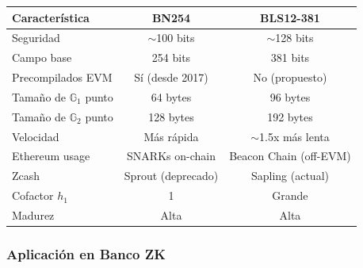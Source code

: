 \documentclass[11pt,a4paper,twoside,openright]{book}
\theoremstyle{definition}
\theoremstyle{plain}
\theoremstyle{remark}
\newcommand{\G}{\mathbb{G}}
\begin{document}
\begin{center}
\begin{tabular}{lcc}
\toprule
\textbf{Característica} & \textbf{BN254} & \textbf{BLS12-381} \\
\midrule
Seguridad & $\sim$100 bits & $\sim$128 bits \\
Campo base & 254 bits & 381 bits \\
Precompilados EVM & Sí (desde 2017) & No (propuesto) \\
Tamaño de $\G_1$ punto & 64 bytes & 96 bytes \\
Tamaño de $\G_2$ punto & 128 bytes & 192 bytes \\
Velocidad & Más rápida & $\sim$1.5x más lenta \\
Ethereum usage & SNARKs on-chain & Beacon Chain (off-EVM) \\
Zcash & Sprout (deprecado) & Sapling (actual) \\
Cofactor $h_1$ & 1 & Grande \\
Madurez & Alta & Alta \\
\bottomrule
\end{tabular}
\end{center}

\subsubsection{Aplicación en Banco ZK}
\end{document}
